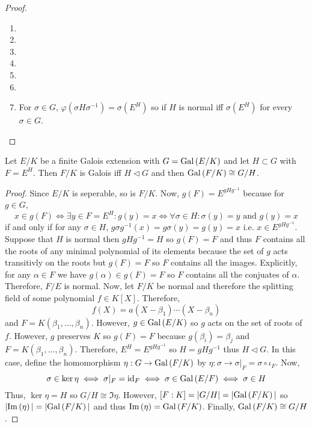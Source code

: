 \documentclass[12pt]{extarticle}
\begin{document}
\begin{proof}
\begin{enumerate}
\item

\item

\item

\item

\item

\item

\item For $\sigma \in G$, $\varphi(\sigma H \sigma^{-1}) = \sigma(E^H)$ so if $H$ is normal iff $\sigma(E^H)$ for every $\sigma \in G$. 

\end{enumerate}

\end{proof}

\begin{proposition}
Let $E/K$ be a finite Galois extension with $G = \mathrm{Gal}\left( E/K \right)$ and let $H \subset G$ with $F = E^H$. Then $F/K$ is Galois iff $H \triangleleft G$ and then $\mathrm{Gal}\left( F/K \right) \cong G/H$. 
\end{proposition}

\begin{proof}
Since $E/K$ is seperable, so is $F/K$.  Now, $g(F) = E^{g H g^{-1}}$ because for $g \in G$, \[x \in g(F) \iff \exists y \in F = E^H  : g(y) = x \iff \forall \sigma \in H : \sigma(y) = y \text{ and } g(y) = x \]
if and only if for any $\sigma \in H$, $g \sigma g^{-1}(x) = g \sigma(y) = g(y) = x$ i.e. $x \in E^{g H g^{-1}}$. Suppose that $H$ is normal then $gHg^{-1} = H$ so $g(F) = F$ and thus $F$ contains all the roots of any minimal polynomial of its elements because the set of $g$ acts transitivly on the roots but $g(F) = F$ so $F$ contains all the images. Explicitly, for any $\alpha \in F$ we have $g(\alpha) \in g(F) = F$ so $F$ contains all the conjuates of $\alpha$. Therefore, $F/E$ is normal. Now, let $F/K$ be normal and therefore the splitting field of some polynomial $f \in K[X]$. Therefore, 
\[f(X) = a (X - \beta_1) \cdots (X - \beta_n)\]
and $F = K(\beta_1, \dots, \beta_n)$. However, $g \in \mathrm{Gal}\left( E/K \right)$ so $g$ acts on the set of roots of $f$. However, $g$ preserves $K$ so $g(F) = F$ because $g(\beta_i) = \beta_j$ and $F = K(\beta_1, \dots, \beta_n)$. Therefore, $E^H = E^{g H g^{-1}}$ so $H = gHg^{-1}$ thus $H \triangleleft G$. In this case, define the homomorphism $\eta : G \to \mathrm{Gal}\left( F/K \right)$ by $\eta : \sigma \to \sigma |_F = \sigma \circ \iota_F$. Now, 
\[\sigma \in \ker{\eta} \iff \sigma|_F = \mathrm{id}_F \iff \sigma \in \mathrm{Gal}\left( E/F \right) \iff \sigma \in H\]
Thus, $\ker{\eta} = H$ so $G/H \cong \Im{\eta}$. However, $[F : K] = |G/H| = |\mathrm{Gal}\left( F/K \right)|$ so $|\mathrm{Im}\left( \eta \right)| = |\mathrm{Gal}\left( F/K \right)|$ and thus $\mathrm{Im}\left( \eta \right) = \mathrm{Gal}\left( F/K \right)$. Finally, $\mathrm{Gal}\left( F/K \right) \cong G/H$.  
\end{proof}
\end{document}

